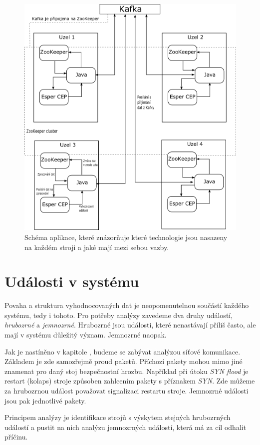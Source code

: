 \documentclass[
  digital, %
  table,   %
  nolof,     %
  nolot,     %
  oneside, %
  nocover,
  monochrome,
  12pt
]{fithesis3}
\begin{document}
\begin{figure}[H]
	\centering
    \includegraphics[width=.7\linewidth, height=.57\textheight]{images/app-architecture.png}
    \caption{Schéma aplikace, které znázorňuje které technologie jsou nasazeny na každém stroji a jaké mají mezi sebou vazby.}
    \label{fig:app-architecture}
\end{figure}

\section{Události v systému}
\label{sec:udalosti-v-systemu}
Povaha a struktura vyhodnocovaných dat je neopomenutelnou součástí každého systému, tedy i tohoto. Pro potřeby analýzy zavedeme dva druhy událostí, \textit{hrubozrné} a \textit{jemnozrné}. Hrubozrné jsou události, které nenastávají příliš často, ale mají v systému důležitý význam. Jemnozrné naopak.

Jak je nastíněno v kapitole \label{sec:analysis}, budeme se zabývat analýzou síťové komunikace. Základem je zde samozřejmě proud paketů. Příchozí pakety mohou mimo jiné znamenat pro daný stoj bezpečnostní hrozbu. Například při útoku \textit{SYN flood} je restart (kolaps) stroje způsoben zahlcením pakety s příznakem \textit{SYN}. Zde můžeme za hrubozrnou událost považovat signalizaci restartu stroje. Jemnozrné události jsou pak jednotlivé pakety.

Principem analýzy je identifikace strojů s výskytem stejných hrubozrných událostí a pustit na nich analýzu jemnozrných událostí, která má za cíl odhalit příčinu.
 
\end{document}
